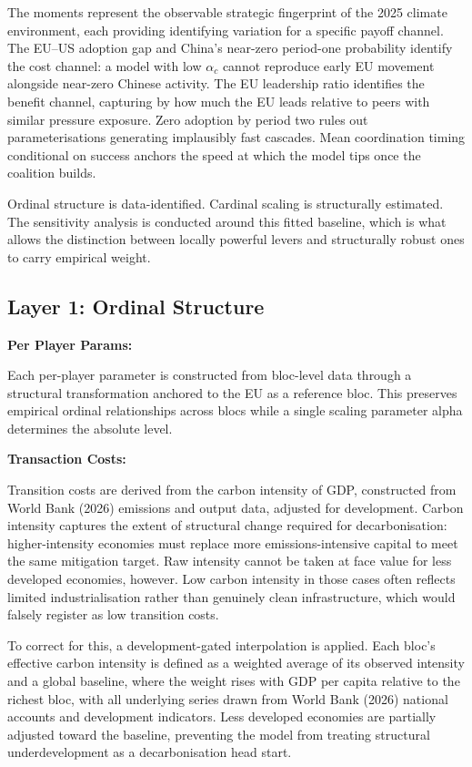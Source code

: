 \documentclass[10pt,a4paper]{article}
\newcommand{\bpar}[1]{\medskip\noindent\textbf{#1}\par}
\begin{document}
The moments represent the observable strategic fingerprint of the 2025 climate environment, each providing identifying variation for a specific payoff channel. The EU--US adoption gap and China's near-zero period-one probability identify the cost channel: a model with low $\alpha_c$ cannot reproduce early EU movement alongside near-zero Chinese activity. The EU leadership ratio identifies the benefit channel, capturing by how much the EU leads relative to peers with similar pressure exposure. Zero adoption by period two rules out parameterisations generating implausibly fast cascades. Mean coordination timing conditional on success anchors the speed at which the model tips once the coalition builds.

Ordinal structure is data-identified. Cardinal scaling is structurally estimated. The sensitivity analysis is conducted around this fitted baseline, which is what allows the distinction between locally powerful levers and structurally robust ones to carry empirical weight.

\needspace{12em}
\subsection{Layer 1: Ordinal Structure}

\bpar{Per Player Params:}
Each per-player parameter is constructed from bloc-level data through a structural transformation
anchored to the EU as a reference bloc. This preserves empirical ordinal relationships across blocs while a
single scaling parameter alpha determines the absolute level.

\bpar{Transaction Costs:}
Transition costs are derived from the carbon intensity of GDP, constructed from World Bank (2026)
emissions and output data, adjusted for development. Carbon intensity captures the extent of structural
change required for decarbonisation: higher-intensity economies must replace more emissions-intensive
capital to meet the same mitigation target. Raw intensity cannot be taken at face value for less developed
economies, however. Low carbon intensity in those cases often reflects limited industrialisation rather
than genuinely clean infrastructure, which would falsely register as low transition costs.

To correct for this, a development-gated interpolation is applied. Each bloc's effective carbon intensity is
defined as a weighted average of its observed intensity and a global baseline, where the weight rises with
GDP per capita relative to the richest bloc, with all underlying series drawn from World Bank (2026)
national accounts and development indicators. Less developed economies are partially adjusted toward the
baseline, preventing the model from treating structural underdevelopment as a decarbonisation head start.
\end{document}
